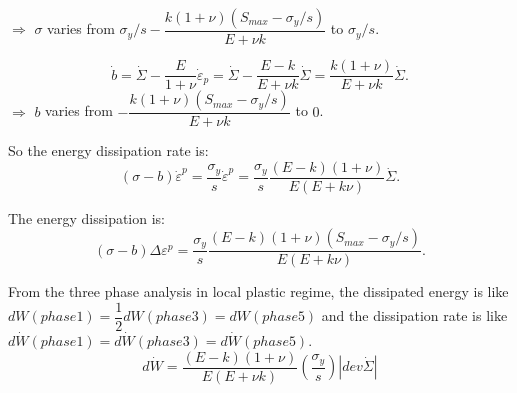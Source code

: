 \vspace{6pt}
\noindent
$\Rightarrow$ $\sigma$ varies from $\sigma_y/s-\dfrac{k(1+\nu)(S_{max}-\sigma_y/s)}{E+\nu k}$ to $\sigma_y/s$.

\vspace{6pt}
$$\dot{b}=\dot{\Sigma}-\dfrac{E}{1+\nu}\dot{\varepsilon}_p=\dot{\Sigma}-\dfrac{E-k}{E+\nu k}\dot{\Sigma}=\dfrac{k(1+\nu)}{E+\nu k}\dot{\Sigma}.$$
\vspace{6pt}
\noindent
$\Rightarrow$ $b$ varies from $-\dfrac{k(1+\nu)(S_{max}-\sigma_y/s)}{E+\nu k}$ to $0$.

\vspace{6pt}
\noindent
So the energy dissipation rate is: $$(\sigma-b)\dot{\varepsilon}^p=\dfrac{\sigma_y}{s}\dot{\varepsilon}^p=\dfrac{\sigma_y}{s}\dfrac{(E- k)(1+\nu)}{E(E+k\nu)}\dot{\Sigma}.$$

\noindent
The energy dissipation is: $$(\sigma-b)\Delta\varepsilon^p=\dfrac{\sigma_y}{s}\dfrac{(E- k)(1+\nu)(S_{max}-\sigma_y/s)}{E(E+k\nu)}.$$


From the three phase analysis in local plastic regime, the dissipated energy is like $dW(phase1)=\dfrac{1}{2}dW(phase3)=dW(phase5)$ and the dissipation rate is like $d\dot{W}(phase1)=d\dot{W}(phase3)=d\dot{W}(phase5)$.
\begin{equation}d\dot{W}=\dfrac{(E-k)(1+\nu) }{E(E+\nu k)}\left( \dfrac{\sigma_y}{s}\right) \left| dev\dot{\Sigma}\right|   
\end{equation}

